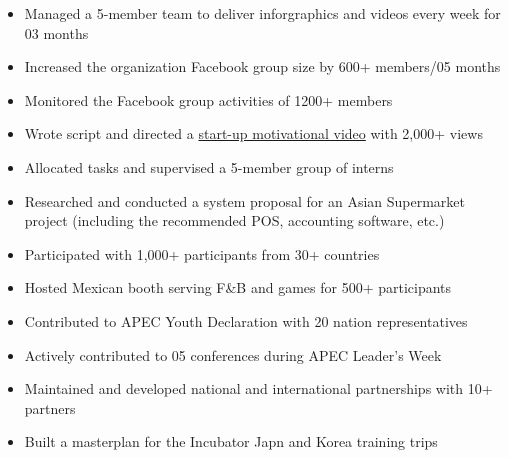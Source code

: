 \documentclass[10pt,a4paper,ragged2e]{altacv}
\begin{document}
\divider

\begin{itemize}
	\item Managed a 5-member team to deliver inforgraphics and videos every week for 03 months 
	\item Increased the organization Facebook group size by 600+ members/05 months
	\item Monitored the Facebook group activities of 1200+ members
	\item Wrote script and directed a {\href{https://www.facebook.com/uavsnsw/videos/433640800560301/}{start-up motivational video}} with 2,000+ views
\end{itemize}

\divider

\begin{itemize}
	\item Allocated tasks and supervised a 5-member group of interns
	\item Researched and conducted a system proposal for an Asian Supermarket project (including the recommended POS, accounting software, etc.)
\end{itemize}


\begin{itemize}
	\item Participated with 1,000+ participants from 30+ countries
	\item Hosted Mexican booth serving F\&B and games for 500+ participants
\end{itemize}

\divider

\begin{itemize}
	\item Contributed to APEC Youth Declaration with 20 nation representatives
	\item Actively contributed to 05 conferences during APEC Leader's Week
\end{itemize}

\divider

\begin{itemize}
	\item Maintained and developed national and international partnerships with 10+ partners
	\item Built a masterplan for the Incubator Japn and Korea training trips 
\end{itemize}
\end{document}
